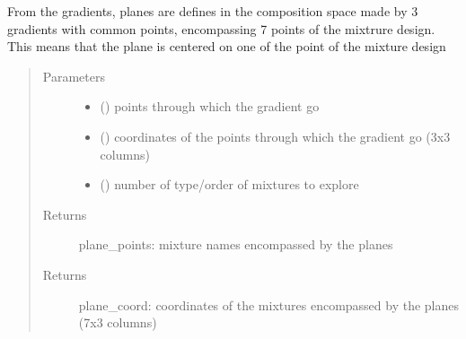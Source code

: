 \documentclass[letterpaper,10pt,english]{sphinxmanual}
\begin{document}
\label{\detokenize{ExperimentsPlannification:module-modules}}

\begin{fulllineitems}
\label{\detokenize{ExperimentsPlannification:modules.compute_planes}}
\sphinxAtStartPar
From the gradients, planes are defines in the composition space made by 3 gradients with common points, encompassing 7 points of the mixtrure design. This means that the plane is centered on one of the point of the mixture design
\begin{quote}

\sphinxAtStartPar
{}
\end{quote}
\begin{quote}\begin{description}
\item[{Parameters}] \leavevmode\begin{itemize}
\item {} 
\sphinxAtStartPar
{} () \textendash{} points through which the gradient go

\item {} 
\sphinxAtStartPar
{} () \textendash{} coordinates of the points through which the gradient go (3x3 columns)

\item {} 
\sphinxAtStartPar
{} () \textendash{} number of type/order of mixtures to explore

\end{itemize}

\item[{Returns}] \leavevmode
\sphinxAtStartPar
plane\_points: mixture names encompassed by the planes

\item[{Returns}] \leavevmode
\sphinxAtStartPar
plane\_coord: coordinates of the mixtures encompassed by the planes (7x3 columns)

\end{description}\end{quote}

\end{fulllineitems}
\end{document}
